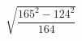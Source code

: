 \begin{ex}[type=calculate]
	\begin{condition}
		\( \sqrt{\dfrac{165^2-124^2}{164}} \)
	\end{condition}
\end{ex}